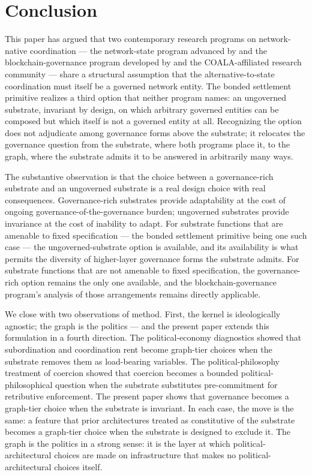 \documentclass[11pt,a4paper]{article}
\theoremstyle{remark}
\begin{document}
\section{Conclusion}
\label{sec:conclusion}

This paper has argued that two contemporary research programs
on network-native coordination --- the network-state program
advanced by \citet{srinivasan2022network} and the
blockchain-governance program developed by
\citet{defilippi_wright_2018} and the COALA-affiliated research
community --- share a structural assumption that
the alternative-to-state coordination must itself be a governed
network entity. The bonded settlement primitive realizes a third
option that neither program names: an ungoverned substrate,
invariant by
design, on which arbitrary governed entities can be composed but
which itself is not a governed entity at all. Recognizing the
option does not adjudicate among governance forms above the
substrate; it relocates the governance question from the
substrate, where both programs place it, to the graph, where
the substrate admits it to be answered in arbitrarily many
ways.

The substantive observation is that the choice between a
governance-rich substrate and an ungoverned substrate is a real
design choice with real consequences. Governance-rich substrates
provide adaptability at the cost of ongoing
governance-of-the-governance burden; ungoverned substrates
provide invariance at the cost of inability to adapt. For
substrate functions that are amenable to fixed specification ---
the bonded settlement primitive being one such case --- the
ungoverned-substrate option is available, and
its availability is what permits the diversity of higher-layer
governance forms the substrate admits. For substrate functions
that are not amenable to fixed specification, the
governance-rich option remains the only one available, and the
blockchain-governance program's analysis of those arrangements
remains directly applicable.

We close with two observations of method. First, the kernel is
ideologically agnostic; the graph is the politics --- and the
present paper extends this formulation in a fourth direction.
The political-economy diagnostics showed that subordination and
coordination rent become graph-tier choices when the substrate
removes them as load-bearing variables. The political-philosophy
treatment of coercion showed that coercion becomes a bounded
political-philosophical question when the substrate substitutes
pre-commitment for retributive enforcement. The present paper shows that governance becomes a
graph-tier choice when the substrate is invariant. In each
case, the move is the same: a feature that prior architectures
treated as constitutive of the substrate becomes a graph-tier
choice when the substrate is designed to exclude it. The graph
is the politics in a strong sense: it is the layer at which
political-architectural choices are made on infrastructure that
makes no political-architectural choices itself.
\end{document}
